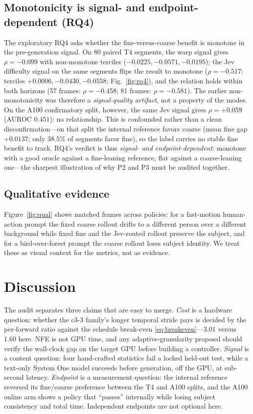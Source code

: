 \documentclass[journal]{IEEEtran}
\newcommand{\ccoarse}{\textup{c3-3}}
\begin{document}
\subsection{Monotonicity is signal- and endpoint-dependent (RQ4)}
\label{sec:rq4}

The exploratory RQ4 asks whether the fine-versus-coarse benefit is monotone in the pre-generation signal. On 80 paired T4 segments, the warp signal gives $\rho = -0.099$ with non-monotone terciles ($-0.0225, -0.0571, -0.0195$); the Jev difficulty signal on the same segments flips the result to monotone ($\rho = -0.517$; terciles $+0.0006, -0.0430, -0.0558$; Fig.~\ref{fig:rq4}), and the relation holds within both horizons (57 frames: $\rho=-0.458$; 81 frames: $\rho=-0.581$). The earlier non-monotonicity was therefore a \emph{signal-quality artifact}, not a property of the modes. On the A100 confirmatory split, however, the same Jev signal gives $\rho = +0.059$ (AUROC $0.451$): no relationship. This is confounded rather than a clean disconfirmation---on that split the internal reference favors coarse (mean fine gap $+0.0137$; only $38.5\%$ of segments favor fine), so the label carries no stable fine benefit to track. RQ4's verdict is thus \emph{signal- and endpoint-dependent}: monotone with a good oracle against a fine-leaning reference, flat against a coarse-leaning one---the sharpest illustration of why P2 and P3 must be audited together.

\subsection{Qualitative evidence}
\label{sec:qual}

Figure~\ref{fig:qual} shows matched frames across policies: for a fast-motion human-action prompt the fixed coarse rollout drifts to a different person over a different background while fixed fine and the Jev-routed rollout preserve the subject, and for a bird-over-forest prompt the coarse rollout loses subject identity. We treat these as visual context for the metrics, not as evidence.

\section{Discussion}
\label{sec:discussion}

The audit separates three claims that are easy to merge. \emph{Cost} is a hardware question: whether the \ccoarse{} family's longer temporal stride pays is decided by the per-forward ratio against the schedule break-even \eqref{eq:breakeven}---$3.01$ versus $1.60$ here. NFE is not GPU time, and any adaptive-granularity proposal should verify the wall-clock gap on the target GPU before building a controller. \emph{Signal} is a content question: four hand-crafted statistics fail a locked held-out test, while a text-only System One model succeeds before generation, off the GPU, at sub-second latency. \emph{Endpoint} is a measurement question: the internal reference reversed its fine/coarse preference between the T4 and A100 splits, and the A100 online arm shows a policy that ``passes'' internally while losing subject consistency and total time. Independent endpoints are not optional here.
\end{document}
